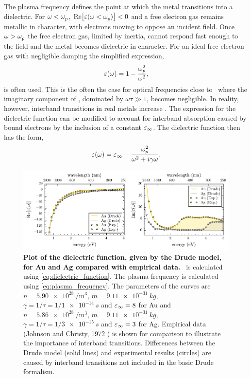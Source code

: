 \documentclass{article}
\begin{document}
The plasma frequency defines the point at which the metal transitions into a dielectric. For $\omega<\omega_{p}^{}$, $\mathrm{Re}\!\left[{\varepsilon(\omega<\omega_{p}^{})}\right] < 0$ and a free electron gas remains metallic in character, with electrons moving to oppose an incident field. Once $\omega > \omega_{p}^{}$ the free electron gas, limited by inertia, cannot respond fast enough to the field and the metal becomes dielectric in character.
For an ideal free electron gas with negligible damping the simplified expression,
\begin{equation}
	\dielectric = 1 - \frac{\omegap[2]}{\omega^2},
	\label{eq:dielectric_approx}
\end{equation}
is often used. This is the often the case for optical frequencies close to \omegap\ where the imaginary component of \dielectric, dominated by $\omega\tau\gg 1$, becomes negligible. In reality, however, interband transitions in real metals increase \imag{\dielectric}.
The expression for the dielectric function can be modified to account for interband absorption caused by bound electrons by the inclusion of a constant $\varepsilon_\infty$. The dielectric function then has the form,
\begin{equation}
	\dielectric = \eps_\infty - \frac{\omegap[2]}{\omega^2 + i\gamma\omega}.
	\label{eq:dielectric_function}
\end{equation}

\begin{figure}[bt]
\centering
\includegraphics{figures/dielectric_function}
\caption[Plot of the dielectric function, given by the Drude model, for Au and Ag compared with empirical data]{\textbf{Plot of the dielectric function, given by the Drude model, for Au and Ag compared with empirical data.} \dielectric\ is calculated using \eqref{eq:dielectric_function}. The plasma frequency is calculated using \eqref{eq:plasma_frequency}. The parameters of the curves are $n=\SI{5.90e28}{\per\metre\cubed}$, $m=\SI{9.11e-31}{kg}$, $\gamma=1/\tau=1/\SI{1e-14}{s}$ and $\varepsilon_\infty = 8$ for Au and $n=\SI{5.86e28}{\per\metre\cubed}$, $m=\SI{9.11e-31}{kg}$, $\gamma=1/\tau=1/\SI{3e-15}{s}$ and $\varepsilon_\infty = 3$ for Ag. Empirical data (Johnson and Christy, 1972 \cite{johnson1972optical}) is shown for comparison to illustrate the importance of interband transitions. Differences between the Drude model (solid lines) and experimental results (circles) are caused by interband transitions not included in the basic Drude formalism.}
\label{fig:dielectric_function}
\end{figure}
\end{document}
